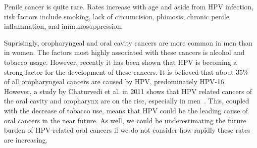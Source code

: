 \documentclass[12pt]{article}
\begin{document}
Penile cancer is quite rare. Rates increase with age and aside from HPV infection, risk factors include smoking, lack of circumcision, phimosis, chronic penile inflammation, and immunosuppression.   

Suprisingly, oropharyngeal and oral cavity cancers are more common in men than in women.  The factors most highly associated with these cancers is alcohol and tobacco usage.  However, recently it has been shown that HPV is becoming a strong factor for the development of these cancers. It is believed that about 35\% of all oropharyngeal cancers are caused by HPV, predominately HPV-16.  However, a study by Chaturvedi et al. in 2011 shows that HPV related cancers of the oral cavity and oropharynx are on the rise, especially in men~\cite{Chaturvedi:2011}.  This, coupled with the decrease of tobacco use, means that HPV could be the leading cause of oral cancers in the near future.  As well, we could be underestimating the future burden of HPV-related oral cancers if we do not consider how rapidly these rates are increasing.  
%
%
\end{document}
